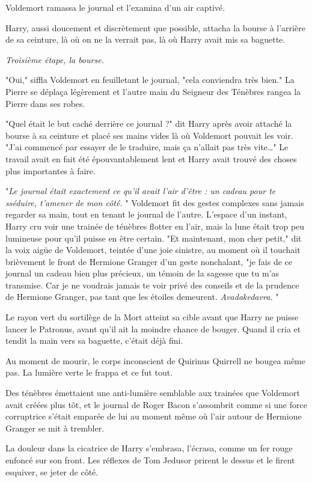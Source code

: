 Voldemort ramassa le journal et l'examina d'un air captivé.

Harry, aussi doucement et discrètement que possible, attacha la bourse à l'arrière de sa ceinture, là où on ne la verrait pas, là où Harry avait mis sa baguette.

\emph{Troisième étape, la bourse.} 

"Oui," siffla Voldemort en feuilletant le journal, "cela conviendra très bien." La Pierre se déplaça légèrement et l'autre main du Seigneur des Ténèbres rangea la Pierre dans ses robes.

"Quel était le but caché derrière ce journal ?" dit Harry après avoir attaché la bourse à sa ceinture et placé ses mains vides là où Voldemort pouvait les voir. "J'ai commencé par essayer de le traduire, mais ça n'allait pas très vite…" Le travail avait en fait été épouvantablement lent et Harry avait trouvé des choses plus importantes à faire.

"\emph{Le journal était exactement ce qu'il avait l'air d'être : un cadeau pour te sséduire, t'amener de mon côté.} " Voldemort fit des gestes complexes sans jamais regarder sa main, tout en tenant le journal de l'autre. L'espace d'un instant, Harry cru voir une trainée de ténèbres flotter en l'air, mais la lune était trop peu lumineuse pour qu'il puisse en être certain. "Et maintenant, mon cher petit," dit la voix aigüe de Voldemort, teintée d'une joie sinistre, au moment où il touchait brièvement le front de Hermione Granger d'un geste nonchalant, "je fais de ce journal un cadeau bien plus précieux, un témoin de la sagesse que tu m'as transmise. Car je ne voudrais jamais te voir privé des conseils et de la prudence de Hermione Granger, pas tant que les étoiles demeurent. \emph{Avadakedavra.} "

Le rayon vert du sortilège de la Mort atteint sa cible avant que Harry ne puisse lancer le Patronus, avant qu'il ait la moindre chance de bouger. Quand il cria et tendit la main vers sa baguette, c'était déjà fini.

Au moment de mourir, le corps inconscient de Quirinus Quirrell ne bougea même pas. La lumière verte le frappa et ce fut tout.

Des ténèbres émettaient une anti-lumière semblable aux trainées que Voldemort avait créées plus tôt, et le journal de Roger Bacon s'assombrit comme si une force corruptrice s'était emparée de lui au moment même où l'air autour de Hermione Granger se mit à trembler.

La douleur dans la cicatrice de Harry s'embrasa, l'écrasa, comme un fer rouge enfoncé sur son front. Les réflexes de Tom Jedusor prirent le dessus et le firent esquiver, se jeter de côté.

